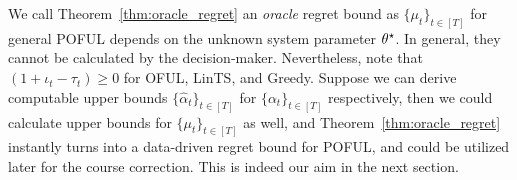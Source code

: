 \begin{remark}
	We call Theorem~\ref{thm:oracle_regret} an  \emph{oracle} regret bound as  $\{\mu_t\}_{t\in[T]}$ for general POFUL depends on the unknown system parameter $\theta^\star$. In general, they cannot be calculated by the decision-maker. Nevertheless, note that $(1+\iota_t -\tau_t) \geq 0$ for OFUL, LinTS, and Greedy. Suppose we can derive computable upper bounds $\{\hat{\alpha}_t\}_{t\in[T]}$ for $\{\alpha_t\}_{t\in[T]}$ respectively, then we could calculate upper bounds for $\{\mu_t\}_{t\in[T]}$ as well, and Theorem~\ref{thm:oracle_regret} instantly turns into a data-driven regret bound for POFUL, and could be utilized later for the course correction. This is indeed our aim in the next section. 
\end{remark}



 



